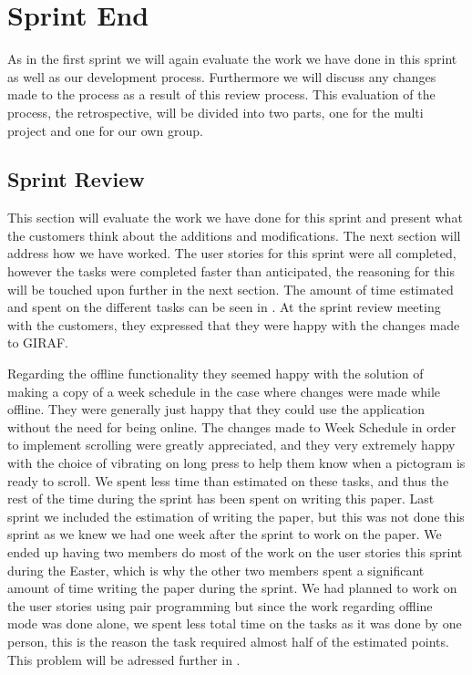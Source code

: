 \chapter{Sprint End}
As in the first sprint we will again evaluate the work we have done in this sprint as well as our development process.
Furthermore we will discuss any changes made to the process as a result of this review process.
This evaluation of the process, the retrospective, will be divided into two parts, one for the multi project and one for our own group.
\section{Sprint Review}
This section will evaluate the work we have done for this sprint and present what the customers think about the additions and modifications.
The next section will address how we have worked.
The user stories for this sprint were all completed, however the tasks were completed faster than anticipated, the reasoning for this will be touched upon further in the next section.
The amount of time estimated and spent on the different tasks can be seen in .
At the sprint review meeting with the customers, they expressed that they were happy with the changes made to GIRAF.

Regarding the offline functionality they seemed happy with the solution of making a copy of a week schedule in the case where changes were made while offline.
They were generally just happy that they could use the application without the need for being online.
The changes made to Week Schedule in order to implement scrolling were greatly appreciated, and they very extremely happy with the choice of vibrating on long press to help them know when a pictogram is ready to scroll.
We spent less time than estimated on these tasks, and thus the rest of the time during the sprint has been spent on writing this paper.
Last sprint we included the estimation of writing the paper, but this was not done this sprint as we knew we had one week after the sprint to work on the paper.
We ended up having two members do most of the work on the user stories this sprint during the Easter, which is why the other two members spent a significant amount of time writing the paper during the sprint.
We had planned to work on the user stories using pair programming but since the work regarding offline mode was done alone, we spent less total time on the tasks as it was done by one person, this is the reason the task required almost half of the estimated points.
This problem will be adressed further in .

